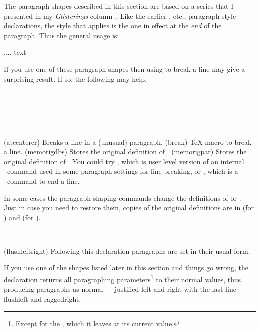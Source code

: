     The paragraph shapes described in this section are based on a series
that I presented in my \emph{Glisterings} column~\cite{GLISTER07,GLISTER08}.
Like the earlier \cmd{\centering}, etc., paragraph style declarations, the
style that applies is the one in effect at the \emph{end} of the paragraph.
Thus the general usage is:
\begin{lcode}
\bgroup%
\paragraphstyle
.... text
\par%
\egroup%
\end{lcode}

    If you use one of these paragraph shapes then using \cmd{\\} to break
a line may give a surprising result. If so, the following may help.
\begin{syntax}
\cmd{\atcentercr} \\
\cmd{\break} \\
\cmd{\memorigdbs} \\
\cmd{\memorigpar} \\
\end{syntax}
\glossary(atcentercr)%
  {}%
  {Breaks a line in a (unusual) paragraph.}
\glossary(break)%
  {}%
  {TeX macro to break a line.}
\glossary(memorigdbs)%
  {}%
  {Stores the original definition of \texttt{\bs}\texttt{\bs}.} %
\glossary(memorigpar)%
  {}%
  {Stores the original definition of %
  .}
You could try \cmd{\atcentcr}, which is user level version of an internal
\ltx\ command used in some paragraph settings for line breaking, 
or \cmd{\break}, which is a \tx\ command to end a line.

   In some cases the paragraph shaping commands change the definitions 
of \cmd{\\} or . Just in case you need to restore them, copies
of the original definitions are in
\cmd{\memorigdbs} (for \cmd{\\}) and \cmd{\memorigpar} (for ).

\begin{syntax}
\cmd{\flushleftright} \\
\end{syntax}
\glossary(flushleftright)%
  {}%
  {Following this declaration paragraphs are set in their usual form.}

    If you use one of the shapes listed later in this section and things
go wrong, the declaration \cmd{\flushleftright} returns all paragraphing
parameters\footnote{Except for the , which it leaves at its
current value.} 
to their normal values, thus producing paragraphs as normal ---
justified left and right with the last line flushleft and raggedright.

